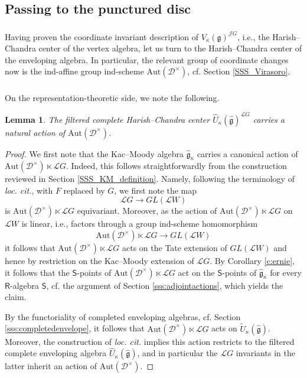 \documentclass{amsart}
\newtheorem{Lem}[Thm]{Lemma}
\theoremstyle{definition}
\newcommand{\sss}{\subsubsection{}}
\newcommand{\fg}{\mathfrak{g}}
\newcommand{\sD}{\mathscr{D}}
\newcommand{\Sing}{\mathsf{S}}
\newcommand{\on}{\mathrm}
\newcommand{\Ring}{\mathsf{R}}
\newcommand{\Jet}{\mathscr{J}}
\newcommand{\Loop}{\mathscr{L}}
\newcommand{\pD}{\sD^\times}
\newcommand{\Aut}{\on{Aut}}
\numberwithin{equation}{section}
\begin{document}
\subsection{Passing to the punctured disc}

\sss{} Having proven the coordinate invariant description of $V_\kappa(\fg)^{\Jet G}$, i.e., the Harish--Chandra center of the vertex algebra, let us turn to the Harish--Chandra center of the enveloping algebra. In particular, the relevant group of coordinate changes now is the ind-affine group ind-scheme $\Aut(\pD)$, cf. Section \ref{SSS_Virasoro}.  

\sss On the representation-theoretic side, we note the following. 

\begin{Lem} The filtered complete Harish--Chandra center $\widehat{U}_{\kappa}(\hat{\fg})^{\Loop G}$ carries a natural action of $\Aut(\pD)$. \label{lem:autpdactonskm}
\end{Lem}

\begin{proof} We first note that the Kac--Moody algebra $\hat{\fg}_\kappa$ carries a canonical action of $\Aut(\pD) \ltimes \Loop G$. Indeed, this follows straightforwardly from the construction reviewed in Section \ref{SSS_KM_definition}. Namely, following the terminology of {\em loc. cit.}, with $F$ replaced by $G$, we first note the map 
$$\Loop G \rightarrow GL(\Loop W)$$is $\Aut(\pD) \ltimes \Loop G$ equivariant. 
Moreover, as the action of $\Aut(\pD) \ltimes \Loop G$ on $\Loop W$ is linear, i.e., factors through a { group ind-scheme homomorphism} $$\Aut(\pD) \ltimes \Loop G \rightarrow GL(\Loop W)$$it follows that $\Aut(\pD) \ltimes \Loop G$ acts on the Tate extension of $GL(\Loop W)$ and hence by restriction on the Kac--Moody extension of $\Loop G$. By Corollary \ref{c:ernie}, it follows that the $\Sing$-points of $\Aut(\pD) \ltimes \Loop G$ act on the $\Sing$-points of $\hat{\fg}_\kappa$ for every $\Ring$-algebra $\Sing$, cf. the argument of Section \ref{sss:adjointactions}, which yields the claim. 

By the functoriality of completed enveloping algebras, cf. Section \ref{sss:completedenvelope}, it follows that $\Aut(\pD) \ltimes \Loop G$ acts on $\widetilde{U}_\kappa(\widehat{\fg})$. Moreover, the construction of {\em loc. cit.} implies this action restricts to the filtered complete enveloping algebra $\widehat{U}_{\kappa}(\hat{\fg})$, and in particular the $\Loop G$ invariants in the latter inherit an action of $\Aut(\pD)$. 
\end{proof}
\end{document}
